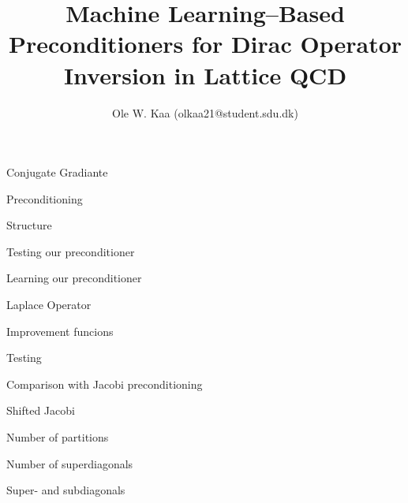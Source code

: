 \documentclass{beamer}
\author{Ole W. Kaa (olkaa21@student.sdu.dk)}
\begin{document}
\begin{frame}{}
    \title{\huge \color{darkgreen} Machine Learning–Based Preconditioners
for Dirac Operator Inversion in Lattice QCD}
    \titlepage
\end{frame}

\begin{frame}{Conjugate Gradiante}
\end{frame}

\begin{frame}{Preconditioning}

\end{frame}


\begin{frame}{Structure}

\end{frame}

\begin{frame}{Testing our preconditioner}

\end{frame}

\begin{frame}{Learning our preconditioner}

\end{frame}


\begin{frame}{Laplace Operator}

\end{frame}


\begin{frame}{Improvement funcions}

\end{frame}


\begin{frame}{Testing}

\end{frame}



\begin{frame}{Comparison with Jacobi preconditioning}

\end{frame}



\begin{frame}{Shifted Jacobi}

\end{frame}


\begin{frame}{Number of partitions}

\end{frame}


\begin{frame}{Number of superdiagonals}

\end{frame}


\begin{frame}{Super- and subdiagonals}

\end{frame}
\end{document}
